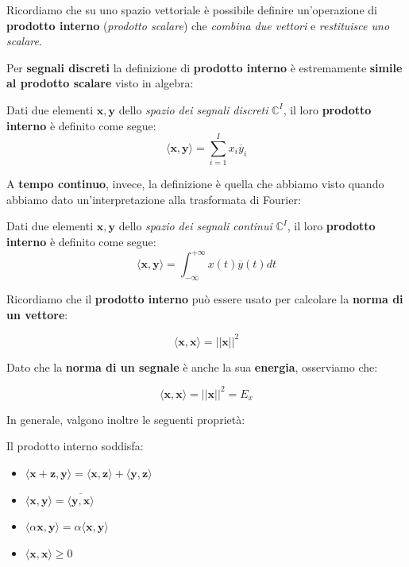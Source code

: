Ricordiamo che su uno spazio vettoriale è possibile definire un'operazione
di \textbf{prodotto interno} (\textit{prodotto scalare}) che 
\textit{combina due vettori} e \textit{restituisce uno scalare}.

Per \textbf{segnali discreti} la definizione di \textbf{prodotto interno}
è estremamente \textbf{simile al prodotto scalare} visto in algebra:

\begin{definition}
    Dati due elementi $\mathbf{x},\mathbf{y}$ dello 
    \textit{spazio dei segnali discreti} $\mathbb{C}^I$, il 
    loro \textbf{prodotto interno} è definito come segue:
    \[
        \langle \mathbf{x}, \mathbf{y} \rangle = \sum_{i=1}^I x_i \overline{y}_i 
    \] 
\end{definition}

A \textbf{tempo continuo}, invece, la definizione è quella che abbiamo visto
quando abbiamo dato un'interpretazione alla trasformata di Fourier:

\begin{definition}
    Dati due elementi $\mathbf{x},\mathbf{y}$ dello 
    \textit{spazio dei segnali continui} $\mathbb{C}^I$, il 
    loro \textbf{prodotto interno} è definito come segue:
    \[
        \langle \mathbf{x}, \mathbf{y} \rangle = \int_{-\infty}^{+\infty} x(t) \overline{y}(t) dt 
    \] 
\end{definition}

Ricordiamo che il \textbf{prodotto interno} può essere
usato per calcolare la \textbf{norma di un vettore}:

\begin{prop}
    \[
        \langle \mathbf{x}, \mathbf{x} \rangle = || \mathbf{x} || ^2
    \] 
\end{prop}

Dato che la \textbf{norma di un segnale} è anche la sua \textbf{energia},
osserviamo che:

\begin{remark}
    \[
        \langle \mathbf{x}, \mathbf{x} \rangle = || \mathbf{x} || ^2 = E_x
    \] 
\end{remark}

In generale, valgono inoltre le seguenti proprietà:

\begin{prop}[PROPRIETA']
    Il prodotto interno soddisfa:
    \begin{itemize}
        \item $\langle \mathbf{x} + \mathbf{z}, \mathbf{y} \rangle 
            = \langle \mathbf{x}, \mathbf{z} \rangle + \langle \mathbf{y}, \mathbf{z} \rangle$
        \item $\langle \mathbf{x}, \mathbf{y} \rangle = \overline{\langle \mathbf{y}, \mathbf{x} \rangle}$
        \item $\langle \alpha\mathbf{x}, \mathbf{y} \rangle = \alpha\langle \mathbf{x}, \mathbf{y} \rangle$
        \item $\langle \mathbf{x}, \mathbf{x} \rangle \ge 0$
    \end{itemize}
\end{prop}

